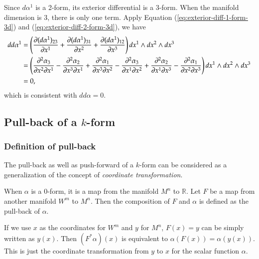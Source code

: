 \documentclass[11pt, a4paper]{book}
\begin{document}
\begin{Example}
  Since $d\alpha^1$ is a 2-form, its exterior differential is a 3-form. When the manifold
  dimension is 3, there is only one term. Apply Equation
  (\ref{eq:exterior-diff-1-form-3d}) and (\ref{eq:exterior-diff-2-form-3d}), we have
  \begin{equation}
    \begin{aligned}
      dd\alpha^1 &= \left( \frac{\partial (d\alpha^1)_{23}}{\partial x^1} + \frac{\partial
          (d\alpha^1)_{31}}{\partial x^2} + \frac{\partial (d\alpha^1)_{12}}{\partial x^3}
      \right) dx^1 \wedge dx^2 \wedge
      dx^3 \\
      &= \left( \frac{\partial^2 \alpha_3}{\partial x^2 \partial x^1} - \frac{\partial^2
          \alpha_2}{\partial x^3 \partial x^1} + \frac{\partial^2 \alpha_1}{\partial x^3 \partial
          x^2} - \frac{\partial^2 \alpha_3}{\partial x^1 \partial x^2} + \frac{\partial^2
          \alpha_2}{\partial x^1 \partial x^3} - \frac{\partial^2 \alpha_1}{\partial x^2 \partial
          x^3} \right) dx^1 \wedge dx^2 \wedge dx^3 \\
      &= 0,
    \end{aligned}
  \end{equation}
  which is consistent with $dd\alpha = 0$.
\end{Example}

\subsection{Pull-back of a $k$-form}

\subsubsection{Definition of pull-back}

The pull-back as well as push-forward of a $k$-form can be considered as a generalization
of the concept of \emph{coordinate transformation}.

When $\alpha$ is a 0-form, it is a map from the manifold $M^n$ to $\mathbb{R}$. Let $F$ be
a map from another manifold $W^m$ to $M^n$. Then the composition of $F$ and $\alpha$ is
defined as the pull-back of $\alpha$.
\begin{center}
\end{center}
If we use $x$ as the coordinates for $W^m$ and $y$ for $M^n$, $F(x)=y$ can be simply
written as $y(x)$. Then $\left( F^{*}\alpha \right)(x)$ is equivalent to
$\alpha(F(x)) = \alpha(y(x))$. This is just the coordinate transformation from $y$ to $x$
for the scalar function $\alpha$.
\end{document}
